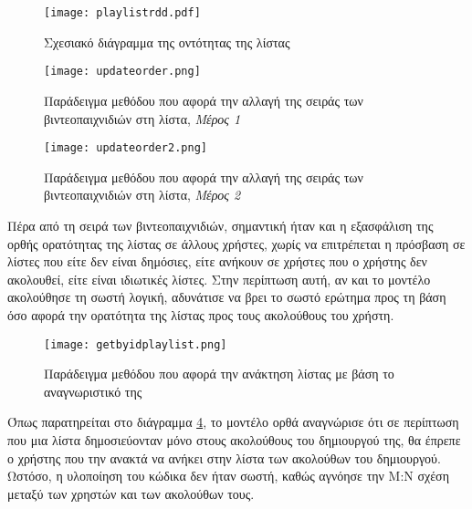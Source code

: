 \begin{figure}[H]
  \begin{center}
    \texttt{[image: playlistrdd.pdf]}
    \caption{Σχεσιακό διάγραμμα της οντότητας της λίστας}
  \end{center}
  \label{fig:playlistRdd}
\end{figure}

\begin{figure}[H]
  \begin{center}
    \texttt{[image: updateorder.png]}
    \caption{Παράδειγμα μεθόδου που αφορά την αλλαγή της σειράς των
    βιντεοπαιχνιδιών στη λίστα, \textit{Μέρος 1}}
  \end{center}
  \label{fig:updateOrder}
\end{figure}

\begin{figure}[H]
  \begin{center}
    \texttt{[image: updateorder2.png]}
    \caption{Παράδειγμα μεθόδου που αφορά την αλλαγή της σειράς των
    βιντεοπαιχνιδιών στη λίστα, \textit{Μέρος 2}}
  \end{center}
  \label{fig:updateOrder2}
\end{figure}

Πέρα από τη σειρά των βιντεοπαιχνιδιών, σημαντική ήταν και η εξασφάλιση
της ορθής ορατότητας της λίστας σε άλλους χρήστες, χωρίς να επιτρέπεται
η πρόσβαση σε λίστες που είτε δεν είναι δημόσιες, είτε ανήκουν σε
χρήστες που ο χρήστης δεν ακολουθεί, είτε είναι ιδιωτικές λίστες.
Στην περίπτωση αυτή, αν και το μοντέλο ακολούθησε τη σωστή λογική,
αδυνάτισε να βρει το σωστό ερώτημα προς τη βάση όσο αφορά την ορατότητα
της λίστας προς τους ακολούθους του χρήστη.

\begin{figure}[H]
  \begin{center}
    \texttt{[image: getbyidplaylist.png]}
    \caption{Παράδειγμα μεθόδου που αφορά την ανάκτηση λίστας με βάση το
    αναγνωριστικό της}
    \label{fig:getByIdPlaylist}
  \end{center}
\end{figure}

Όπως παρατηρείται στο διάγραμμα \ref{fig:getByIdPlaylist}, το μοντέλο
ορθά αναγνώρισε ότι σε περίπτωση που μια λίστα δημοσιεύονταν μόνο στους
ακολούθους του δημιουργού της, θα έπρεπε ο χρήστης που την ανακτά να ανήκει στην λίστα των ακολούθων του δημιουργού. Ωστόσο, η υλοποίηση
του κώδικα δεν ήταν σωστή, καθώς αγνόησε την Μ:Ν σχέση μεταξύ των
χρηστών και των ακολούθων τους.


